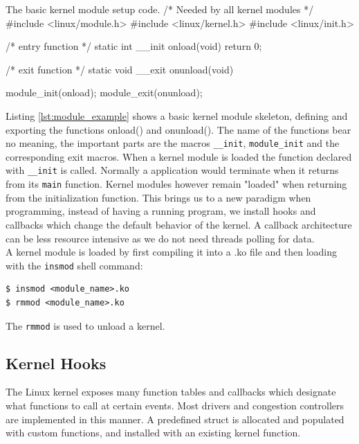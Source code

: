 \documentclass[a4paper,english, 11pt]{report}
\begin{document}
\begin{autonumlstlisting}[label=lst:module_example]{The basic kernel module setup code.}
/* Needed by all kernel modules */
#include <linux/module.h> 
#include <linux/kernel.h>
#include <linux/init.h>

/* entry function */
static int __init onload(void) {
    return 0;
}

/* exit function */
static void __exit onunload(void) {
    
}

module_init(onload);
module_exit(onunload);
\end{autonumlstlisting}

Listing \ref{lst:module_example} shows a basic kernel module skeleton, defining and exporting the functions onload() and onunload(). The name of the functions bear no meaning, the important parts are the macros \verb|__init|, \verb|module_init| and the corresponding exit macros\cite{lkm}. When a kernel module is loaded the function declared with \verb|__init| is called. Normally a application would terminate when it returns from its \verb|main| function. Kernel modules however remain "loaded" when returning from the initialization function. This brings us to a new paradigm when programming, instead of having a running program, we install hooks and callbacks which change the default behavior of the kernel. A callback architecture can be less resource intensive as we do not need threads polling for data.\\

A kernel module is loaded by first compiling it into a .ko file and then loading with the \verb|insmod| shell command:
\begin{verbatim}
$ insmod <module_name>.ko
$ rmmod <module_name>.ko
\end{verbatim}
The \verb|rmmod| is used to unload a kernel. 

\subsection{Kernel Hooks}
The Linux kernel exposes many function tables and callbacks which designate what functions to call at certain events. Most drivers and congestion controllers are implemented in this manner. A predefined struct is allocated and populated with custom functions, and installed with an existing kernel function.
\end{document}
